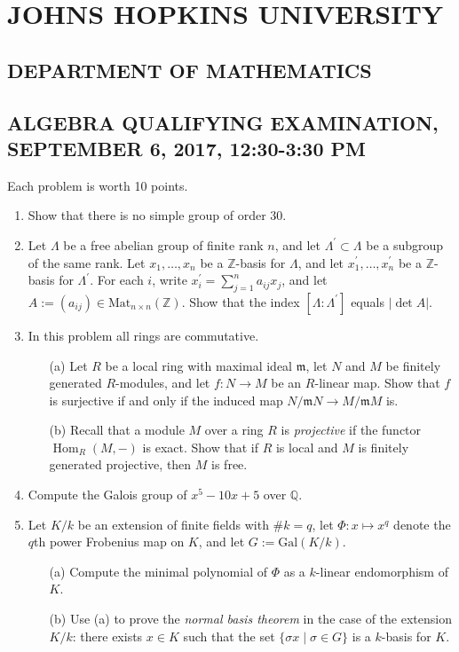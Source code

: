 \documentclass{article}
\begin{document}
\section*{JOHNS HOPKINS UNIVERSITY}
\subsection*{DEPARTMENT OF MATHEMATICS}
\subsection*{ALGEBRA QUALIFYING EXAMINATION, SEPTEMBER 6, 2017, 12:30-3:30 PM}

Each problem is worth 10 points.

\begin{enumerate}
    \item Show that there is no simple group of order 30.

    \item Let \(\Lambda\) be a free abelian group of finite rank \(n\), and let \(\Lambda^{\prime}\subset\Lambda\) be a subgroup of the same rank. Let \(x_{1},\ldots,x_{n}\) be a \(\mathbb{Z}\)-basis for \(\Lambda\), and let \(x^{\prime}_{1},\ldots,x^{\prime}_{n}\) be a \(\mathbb{Z}\)-basis for \(\Lambda^{\prime}\). For each \(i\), write \(x^{\prime}_{i}=\sum_{j=1}^{n}a_{ij}x_{j}\), and let \(A:=(a_{ij})\in \text{Mat}_{n\times n}(\mathbb{Z})\). Show that the index \([\Lambda:\Lambda^{\prime}]\) equals \(|\det A|\).

    \item In this problem all rings are commutative.
    \begin{itemize}
        \item[(a)] Let \(R\) be a local ring with maximal ideal \(\mathfrak{m}\), let \(N\) and \(M\) be finitely generated \(R\)-modules, and let \(f\colon N\to M\) be an \(R\)-linear map. Show that \(f\) is surjective if and only if the induced map \(N/\mathfrak{m}N\to M/\mathfrak{m}M\) is.
        \item[(b)] Recall that a module \(M\) over a ring \(R\) is \textit{projective} if the functor \(\operatorname{Hom}_{R}(M,-)\) is exact. Show that if \(R\) is local and \(M\) is finitely generated projective, then \(M\) is free.
    \end{itemize}

    \item Compute the Galois group of \(x^{5}-10x+5\) over \(\mathbb{Q}\).

    \item Let \(K/k\) be an extension of finite fields with \(\#k=q\), let \(\Phi\colon x\mapsto x^{q}\) denote the \(q\)th power Frobenius map on \(K\), and let \(G:=\text{Gal}(K/k)\).
    \begin{itemize}
        \item[(a)] Compute the minimal polynomial of \(\Phi\) as a \(k\)-linear endomorphism of \(K\).
        \item[(b)] Use (a) to prove the \textit{normal basis theorem} in the case of the extension \(K/k\): there exists \(x\in K\) such that the set \(\{\sigma x\mid\sigma\in G\}\) is a \(k\)-basis for \(K\).
    \end{itemize}


\end{enumerate}
\end{document}

